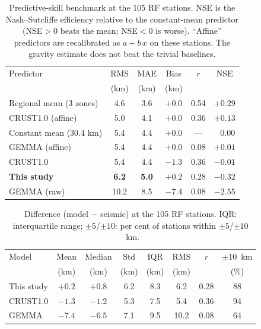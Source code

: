 \documentclass{agujournal2019}
\begin{document}
\begin{table}
\caption{Predictive-skill benchmark at the 105 RF stations. NSE is the
Nash--Sutcliffe efficiency relative to the constant-mean predictor (NSE${}>0$ beats
the mean; NSE${}<0$ is worse). ``Affine'' predictors are recalibrated as
$a+b\,x$ on these stations. The gravity estimate does not beat the trivial
baselines.}
\label{tab:skill}
\centering
\begin{tabular}{lccccc}
\hline
Predictor & RMS & MAE & Bias & $r$ & NSE\\
          & (km)& (km)& (km) &     & \\
\hline
Regional mean (3 zones)   & 4.6 & 3.6 & $+0.0$ & 0.54 & $+0.29$\\
CRUST1.0 (affine)         & 5.0 & 4.1 & $+0.0$ & 0.36 & $+0.13$\\
Constant mean (30.4 km)   & 5.4 & 4.4 & $+0.0$ & ---  & $\;\;\,0.00$\\
GEMMA (affine)            & 5.4 & 4.4 & $+0.0$ & 0.08 & $+0.01$\\
CRUST1.0                  & 5.4 & 4.4 & $-1.3$ & 0.36 & $-0.01$\\
\textbf{This study}       & \textbf{6.2} & \textbf{5.0} & $+0.2$ & 0.28 & $\mathbf{-0.32}$\\
GEMMA (raw)               & 10.2& 8.5 & $-7.4$ & 0.08 & $-2.55$\\
\hline
\end{tabular}
\end{table}

\begin{table}
\caption{Difference (model $-$ seismic) at the 105 RF stations. IQR: interquartile
range; $\pm5$/$\pm10$: per cent of stations within $\pm5$/$\pm10$~km.}
\label{tab:compare}
\centering
\begin{tabular}{lccccccc}
\hline
Model & Mean & Median & Std & IQR & RMS & $r$ & $\pm10$~km\\
      & (km) & (km)   & (km)& (km)& (km)&     & (\%)\\
\hline
This study & $+0.2$ & $+0.8$ & 6.2 & 8.3 & 6.2 & 0.28 & 88\\
CRUST1.0   & $-1.3$ & $-1.2$ & 5.3 & 7.5 & 5.4 & 0.36 & 94\\
GEMMA      & $-7.4$ & $-6.5$ & 7.1 & 9.5 & 10.2 & 0.08 & 64\\
\hline
\end{tabular}
\end{table}
\end{document}
